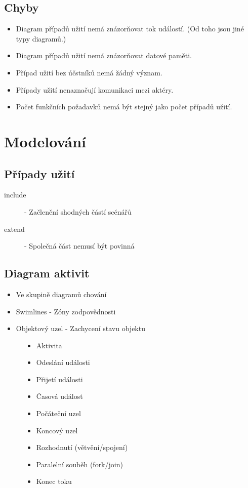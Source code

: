 \documentclass{szzclass}
\begin{document}
\subsection{Chyby}
\begin{itemize}
\item Diagram případů užití nemá znázorňovat tok událostí. (Od toho jsou jiné typy diagramů.)
\item Diagram případů užití nemá znázorňovat datové paměti.
\item Případ užití bez účstníků nemá žádný význam.
\item Případy užití nenaznačují komunikaci mezi aktéry.
\item Počet funkčních požadavků nemá být stejný jako počet případů užití.
\end{itemize}

\section{Modelování}
\subsection{Případy užití}
\begin{description}
\item[include] - Začlenění shodných částí scénářů
\item[extend] - Společná část nemusí být povinná
\end{description}

\subsection{Diagram aktivit}
\begin{itemize}
\item Ve skupině diagramů chování
\item Swimlines - Zóny zodpovědnosti
\item Objektový uzel - Zachycení stavu objektu
\end{itemize}

\begin{figure}[ht!]
\centering
\begin{minipage}{.5\textwidth}
\begin{itemize}
    \item Aktivita
    \item Odeslání události
    \item Přijetí události
    \item Časová událost
\end{itemize}
\end{minipage}%
\begin{minipage}{.5\textwidth}
\begin{itemize}
    \item Počáteční uzel
    \item Koncový uzel
    \item Rozhodnutí (větvění/spojení)
    \item Paralelní souběh (fork/join)
    \item Konec toku
\end{itemize}
\end{minipage}
\end{figure}
\end{document}
